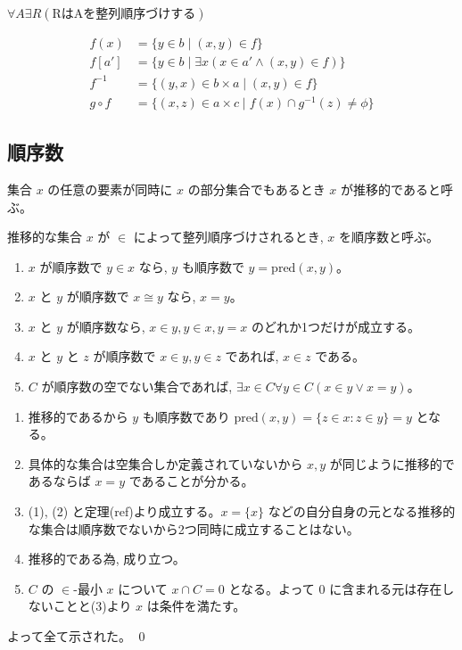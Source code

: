 \documentclass[uplatex,dvipdfmx,a4paper,11pt]{jlreq}
\makeatletter
\theoremstyle{definition}
\renewenvironment{proof}[1][\proofname]{\par
  \normalfont
  \topsep6\p@\@plus6\p@ \trivlist
  \item[\hskip\labelsep{\bfseries #1}\@addpunct{\bfseries}]\ignorespaces\quad\par
}{%
  \qed\endtrivlist\@endpefalse
}
\renewcommand\proofname{証明}
\makeatother
\begin{document}
\begin{axiom}[選択公理]
  $\forall A\exists R(\text{RはAを整列順序づけする})$
\end{axiom}

\begin{align}
  f(x)     & = \{y\in b\mid (x, y)\in f\}                             \\
  f[a']    & = \{y\in b\mid \exists x(x\in a'\land (x, y)\in f)\}     \\
  f^{-1}   & = \{(y, x)\in b\times a\mid (x, y)\in f\}                \\
  g\circ f & = \{(x, z)\in a\times c\mid f(x)\cap g^{-1}(z)\neq\phi\}
\end{align}


\subsection{順序数}
\begin{definition}[推移的]
  集合 $x$ の任意の要素が同時に $x$ の部分集合でもあるとき $x$ が推移的であると呼ぶ。
\end{definition}
\begin{definition}[順序数]
  推移的な集合 $x$ が $\in$ によって整列順序づけされるとき, $x$ を順序数と呼ぶ。
\end{definition}

\begin{theorem}
  \begin{enumerate}
    \item $x$ が順序数で $y\in x$ なら, $y$ も順序数で $y=\mathrm{pred}(x,y)$。
    \item $x$ と $y$ が順序数で $x\cong y$ なら, $x=y$。
    \item $x$ と $y$ が順序数なら, $x\in y, y\in x, y=x$ のどれか1つだけが成立する。
    \item $x$ と $y$ と $z$ が順序数で $x\in y, y\in z$ であれば, $x\in z$ である。
    \item $C$ が順序数の空でない集合であれば, $\exists x\in C\forall y\in C(x\in y\lor x=y)$。
  \end{enumerate}
\end{theorem}
\begin{proof}
  \begin{enumerate}
    \item 推移的であるから $y$ も順序数であり $\mathrm{pred}(x,y) = \{z\in x:z \in y\} = y$ となる。
    \item 具体的な集合は空集合しか定義されていないから $x, y$ が同じように推移的であるならば $x = y$ であることが分かる。
    \item (1), (2) と定理(ref)より成立する。$x=\{x\}$ などの自分自身の元となる推移的な集合は順序数でないから2つ同時に成立することはない。
    \item 推移的である為, 成り立つ。
    \item $C$ の $\in$-最小 $x$ について $x\cap C = 0$ となる。よって $0$ に含まれる元は存在しないことと(3)より $x$ は条件を満たす。
  \end{enumerate}
  よって全て示された。
\end{proof}
\end{document}
